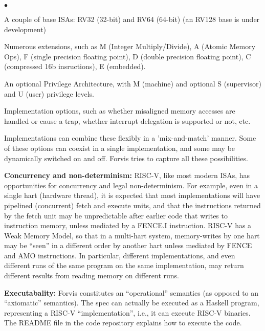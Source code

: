 \documentclass[11pt]{article}
\newenvironment{tightlist}%
{\begin{list}{$\bullet$}{%
    \setlength{\topsep}{0in}
    \setlength{\partopsep}{0in}
    \setlength{\itemsep}{0in}
    \setlength{\parsep}{0in}
    \setlength{\leftmargin}{1.5em}
    \setlength{\rightmargin}{0in}
    \setlength{\itemindent}{0in}
}
}%
{\end{list}
}
\begin{document}
\begin{itemize}
  \begin{tightlist}
   \item A couple of base ISAs: RV32 (32-bit) and RV64 (64-bit) (an RV128 base is under development)

   \item Numerous extensions, such as M (Integer Multiply/Divide), A
    (Atomic Memory Ops), F (single precision floating point), D
    (double precision floating point), C (compressed 16b insructions), E (embedded).

   \item An optional Privilege Architecture, with M (machine) and
    optional S (supervisor) and U (user) privilege levels.

   \item Implementation options, such as whether misaligned memory
   accesses are handled or cause a trap, whether interrupt delegation
   is supported or not, etc.

  \end{tightlist}

  Implementations can combine these flexibly in a 'mix-and-match'
  manner.  Some of these options can coexist in a single
  implementation, and some may be dynamically switched on and off.
  Forvis tries to capture all these possibilities.

\item {\bf Concurrency and non-determinism:} RISC-V, like most modern
ISAs, has opportunities for concurrency and legal non-determinism.
For example, even in a single hart (hardware thread), it is expected
that most implementations will have pipelined (concurrent) fetch and
execute units, and that the instructions returned by the fetch unit
may be unpredictable after earlier code that writes to instruction
memory, unless mediated by a FENCE.I instruction.  RISC-V has a Weak
Memory Model, so that in a multi-hart system, memory-writes by one
hart may be ``seen'' in a different order by another hart unless
mediated by FENCE and AMO instructions.  In particular, different
implementations, and even different runs of the same program on the
same implementation, may return different results from reading memory
on different runs.

\item {\bf Executabality:} Forvis constitutes an ``operational''
semantics (as opposed to an ``axiomatic'' semantics).  The spec can
actually be executed as a Haskell program, representing a RISC-V
``implementation'', i.e., it can execute RISC-V binaries.  The README
file in the code repository explains how to execute the code.

\end{itemize}
\end{document}
